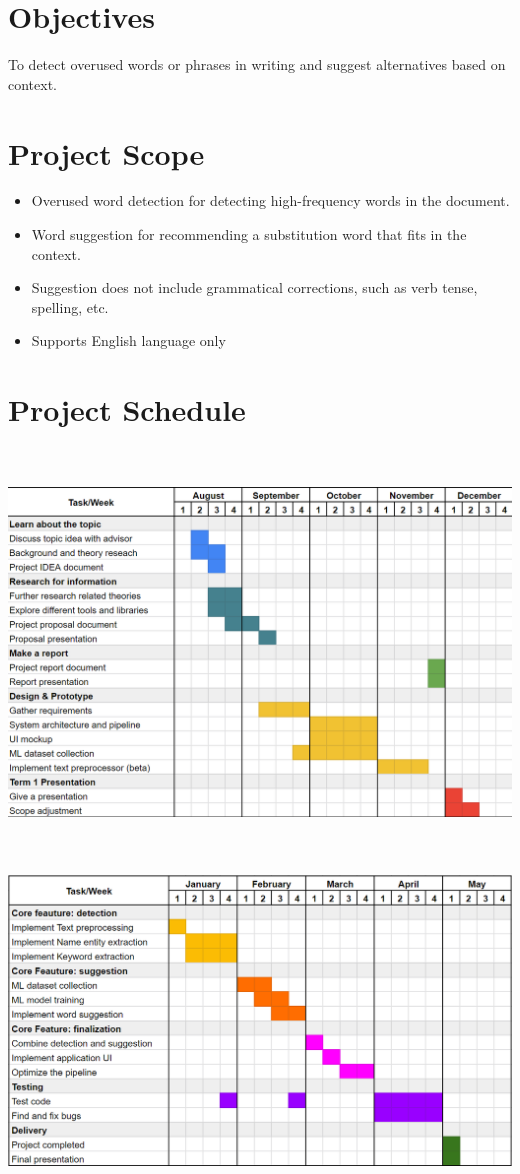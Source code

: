 \documentclass[12pt,oneside,openright,a4paper]{cpe-english-project}
\begin{document}
\section{Objectives}
To detect overused words or phrases in writing and suggest alternatives based on context.

\section{Project Scope}
\begin{itemize}
\item Overused word detection for detecting high-frequency words in the document.
\item Word suggestion for recommending a substitution word that fits in the context.
\item Suggestion does not include grammatical corrections, such as verb tense, spelling, etc.
\item Supports English language only
\end{itemize}

\section{Project Schedule}
\\ \\
\includegraphics[width=15cm]{./img/chp1/schedule1.png}

\\ \\
\includegraphics[width=15cm]{./img/chp1/schedule2.png}\\
\end{document}
